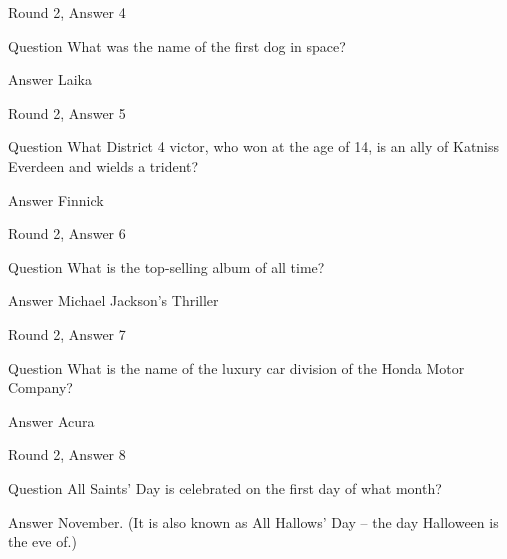 \documentclass[11pt]{beamer}
\begin{document}
\begin{frame}[t]{Round 2, Answer 4}
\vspace{2em}
\begin{block}{Question}
What was the name of the first dog in space\@?
\end{block}
\pause{}
\begin{block}{Answer}
Laika
\end{block}
\end{frame}
    

\begin{frame}[t]{Round 2, Answer 5}
\vspace{2em}
\begin{block}{Question}
What District 4 victor, who won at the age of 14, is an ally of Katniss Everdeen and wields a trident\@?
\end{block}
\pause{}
\begin{block}{Answer}
Finnick
\end{block}
\end{frame}
    

\begin{frame}[t]{Round 2, Answer 6}
\vspace{2em}
\begin{block}{Question}
What is the top-selling album of all time\@?
\end{block}
\pause{}
\begin{block}{Answer}
Michael Jackson's Thriller
\end{block}
\end{frame}
    

\begin{frame}[t]{Round 2, Answer 7}
\vspace{2em}
\begin{block}{Question}
What is the name of the luxury car division of the Honda Motor Company\@?
\end{block}
\pause{}
\begin{block}{Answer}
Acura
\end{block}
\end{frame}
    

\begin{frame}[t]{Round 2, Answer 8}
\vspace{2em}
\begin{block}{Question}
All Saints' Day is celebrated on the first day of what month\@?
\end{block}
\pause{}
\begin{block}{Answer}
November. (It is also known as All Hallows' Day -- the day Halloween is the eve of.)
\end{block}
\end{frame}
    
\end{document}
